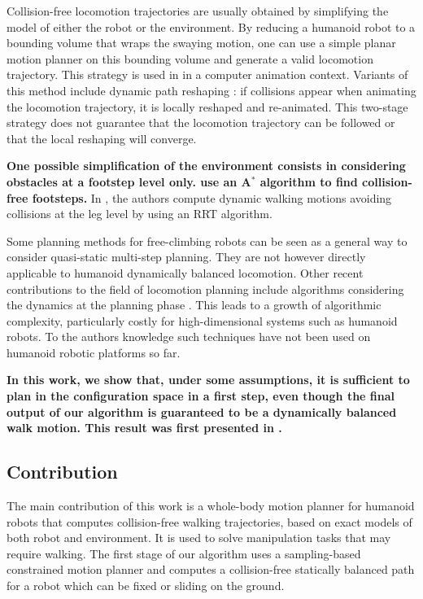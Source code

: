\documentclass{article}
\begin{document}
Collision-free  locomotion   trajectories  are  usually   obtained  by
simplifying the model of either the  robot or the environment. By reducing 
a  humanoid robot to a bounding volume that wraps the swaying motion,
one can  use a simple  planar motion planner  on this bounding  volume and
generate  a valid  locomotion  trajectory. This  strategy  is used  in
\cite{pettre20032} in a computer animation context. Variants of this method
include  dynamic path reshaping  \cite{yoshida-humanoids05}: if  collisions appear
when animating  the locomotion  trajectory, it is  locally reshaped
and re-animated.  This two-stage  strategy does not guarantee that the
locomotion trajectory can be followed or that the local reshaping will
converge.

\textbf{One possible simplification of the environment consists in
  considering obstacles at a footstep level only.
  \cite{kuffner2001footstep,chestnutt2005footstep,kuffner2005motion}
  use an A$^{*}$ algorithm to find collision-free footsteps.}  In
\cite{perrin2012fast}, the authors compute dynamic walking motions
avoiding collisions at the leg level by using an RRT algorithm.

Some planning methods for free-climbing robots \cite{bretl2006motion}
can be seen as a general way 
to consider quasi-static multi-step planning. They are not however directly applicable to
humanoid dynamically balanced locomotion.
Other recent contributions to the field of locomotion planning  include algorithms 
considering the dynamics at the planning phase \cite{shkolnik2011bounding}. This leads to 
a growth of algorithmic complexity, particularly costly for high-dimensional
systems such as humanoid robots. To the authors knowledge such techniques have not been
used on humanoid robotic platforms so far.

\textbf{In this work, we show that, under some assumptions, it is
  sufficient to plan in the configuration space in a first step, even
  though the final output of our algorithm is guaranteed to be a
  dynamically balanced walk motion. This result was first presented in
  \cite{dalibard2011small}.}

\subsection{Contribution}

The main contribution of this work is a whole-body motion planner for
humanoid robots that computes collision-free walking trajectories,
based on exact models of both robot and environment. It is used to
solve manipulation tasks that may require walking. The first stage of
our algorithm uses a sampling-based constrained motion planner and
computes a collision-free statically balanced path for a robot which
can be fixed or sliding on the ground.
\end{document}
